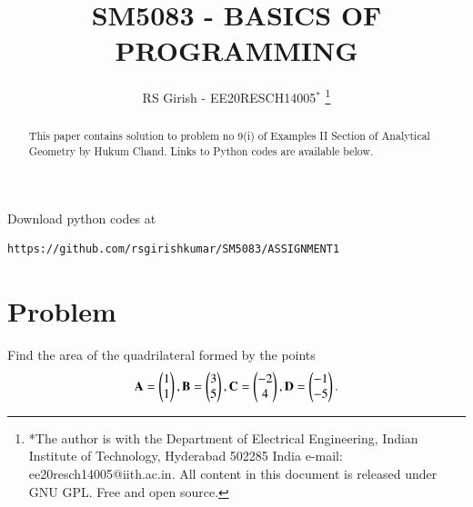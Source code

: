 \documentclass[journal,12pt,twocolumn]{IEEEtran}
\begin{document}
\makeatletter
{}
\makeatother
\let\StandardTheFigure\thefigure
\let\vec\mathbf
\renewcommand{\thefigure}{\theproblem}
\def\putbox#1#2#3{\makebox[0in][l]{\makebox[#1][l]{}\raisebox{\baselineskip}[0in][0in]{\raisebox{#2}[0in][0in]{#3}}}}
     \def\rightbox#1{\makebox[0in][r]{#1}}
     \def\centbox#1{\makebox[0in]{#1}}
     \def\topbox#1{\raisebox{-\baselineskip}[0in][0in]{#1}}
     \def\midbox#1{\raisebox{-0.5\baselineskip}[0in][0in]{#1}}
\vspace{3cm}
\title{
SM5083 - BASICS OF PROGRAMMING
	}
\author{ RS Girish - EE20RESCH14005$^{*}$%
\thanks{*The author is with the Department
		of Electrical Engineering, Indian Institute of Technology, Hyderabad
		502285 India e-mail:  ee20resch14005@iith.ac.in. All content in this document is released under GNU GPL.  Free and open source.}
	}
\maketitle
\newpage
\tableofcontents
\bigskip
\renewcommand{\thefigure}{\theenumi}
\renewcommand{\thetable}{\theenumi}
\begin{abstract}
This paper contains solution to problem no 9(i) of Examples II Section of Analytical Geometry by Hukum Chand.
Links to Python codes are available below.  
\end{abstract}
Download python codes at 
\begin{lstlisting}
https://github.com/rsgirishkumar/SM5083/ASSIGNMENT1
\end{lstlisting}
\section{Problem}
Find the area of the quadrilateral formed by the points\\
\begin{align}
\begin{split}
\vec{A} = \myvec{1 \\ 1}, 
\vec{B} = \myvec{3 \\ 5}, 
\vec{C} = \myvec{-2 \\ 4}, 
\vec{D} = \myvec{-1 \\ -5}. 
\end{split}
\end{align}
\end{document}
